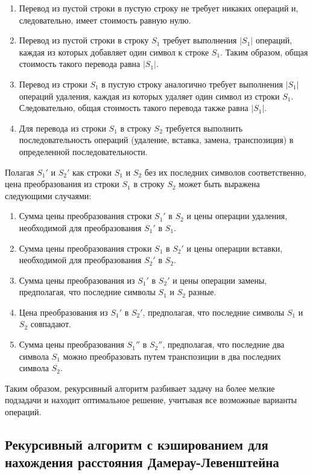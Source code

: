 \begin{enumerate}[label=\arabic*)]
	\item Перевод из пустой строки в пустую строку не требует никаких операций и, следовательно, имеет стоимость равную нулю.
	\item Перевод из пустой строки в строку $S_{1}$ требует выполнения $|S_{1}|$ операций, каждая из которых добавляет один символ к строке $S_{1}$. Таким образом, общая стоимость такого перевода равна $|S_{1}|$.
	\item Перевод из строки $S_{1}$ в пустую строку аналогично требует выполнения $|S_{1}|$ операций удаления, каждая из которых удаляет один символ из строки $S_{1}$. Следовательно, общая стоимость такого перевода также равна $|S_{1}|$.
	\item Для перевода из строки $S_{1}$ в строку $S_{2}$ требуется выполнить последовательность операций (удаление, вставка, замена, транспозиция) в определенной последовательности.
\end{enumerate}

Полагая $S_{1}'$ и $S_{2}'$ как строки $S_{1}$ и $S_{2}$ без их последних символов соответственно, цена преобразования из строки $S_{1}$ в строку $S_{2}$ может быть выражена следующими случаями:
\begin{enumerate}
   \item Сумма цены преобразования строки $S_{1}'$ в $S_{2}$ и цены операции удаления, необходимой для преобразования $S_{1}'$ в $S_{1}$.
   \item Сумма цены преобразования строки $S_{1}$ в $S_{2}'$ и цены операции вставки, необходимой для преобразования $S_{2}'$ в $S_{2}$.
   \item Сумма цены преобразования из $S_{1}'$ в $S_{2}'$ и цены операции замены, предполагая, что последние символы $S_{1}$ и $S_{2}$ разные.
   \item Цена преобразования из $S_{1}'$ в $S_{2}'$, предполагая, что последние символы $S_{1}$ и $S_{2}$ совпадают.
   \item Сумма цены преобразования $S_{1}''$ в $S_{2}''$, предполагая, что последние два символа $S_{1}$ можно преобразовать путем транспозиции в два последних символа $S_{2}$.
\end{enumerate}

Таким образом, рекурсивный алгоритм разбивает задачу на более мелкие подзадачи и находит оптимальное решение, учитывая все возможные варианты операций.

\subsection{Рекурсивный алгоритм с кэшированием для нахождения расстояния Дамерау-Левенштейна}

